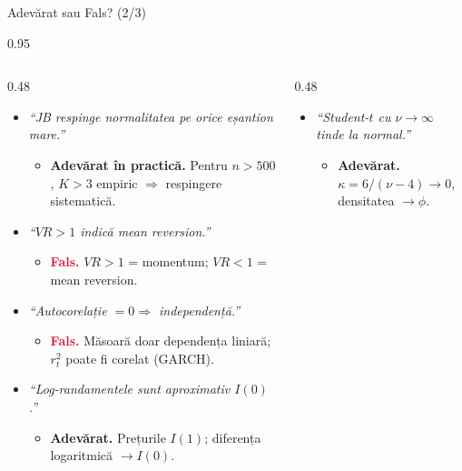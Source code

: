 \documentclass[9pt, aspectratio=169, t]{beamer}
\begin{document}
\begin{frame}[shrink=25]{Adevărat sau Fals? (2/3)}
\begin{cminipage}{0.95\textwidth}
\begin{columns}[T]
\begin{column}{0.48\textwidth}
\begin{itemize}\setlength{\itemsep}{1pt}
    \item \textit{``JB respinge normalitatea pe orice eșantion mare.''}
    \begin{itemize}\setlength{\itemsep}{0pt}
        \item[] \textcolor{Forest}{\textbf{Adevărat în practică.}} Pentru $n > 500$, $K > 3$ empiric $\Rightarrow$ respingere sistematică.
    \end{itemize}
    \item \textit{``$VR > 1$ indică mean reversion.''}
    \begin{itemize}\setlength{\itemsep}{0pt}
        \item[] \textcolor{Crimson}{\textbf{Fals.}} $VR > 1$ = momentum; $VR < 1$ = mean reversion.
    \end{itemize}
    \item \textit{``Autocorelație $= 0 \Rightarrow$ independență.''}
    \begin{itemize}\setlength{\itemsep}{0pt}
        \item[] \textcolor{Crimson}{\textbf{Fals.}} Măsoară doar dependența liniară; $r_t^2$ poate fi corelat (GARCH).
    \end{itemize}
    \item \textit{``Log-randamentele sunt aproximativ $I(0)$.''}
    \begin{itemize}\setlength{\itemsep}{0pt}
        \item[] \textcolor{Forest}{\textbf{Adevărat.}} Prețurile $I(1)$; diferența logaritmică $\to I(0)$.
    \end{itemize}
\end{itemize}
\end{column}
\begin{column}{0.48\textwidth}
\begin{itemize}\setlength{\itemsep}{1pt}
    \item \textit{``Student-$t$ cu $\nu \to \infty$ tinde la normal.''}
    \begin{itemize}\setlength{\itemsep}{0pt}
        \item[] \textcolor{Forest}{\textbf{Adevărat.}} $\kappa = 6/(\nu-4) \to 0$, densitatea $\to \phi$.
    \end{itemize}

\end{itemize}
\end{column}
\end{columns}
\end{cminipage}
\end{frame}
\end{document}
